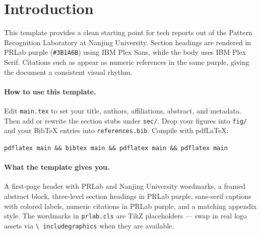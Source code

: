 \section{Introduction}
\label{sec:intro}

This template provides a clean starting point for tech reports out of the
Pattern Recognition Laboratory at Nanjing University. Section headings are
rendered in PRLab purple (\texttt{\#3B1A6B}) using IBM Plex Sans, while
the body uses IBM Plex Serif. Citations such as \citep{vaswani2017attention}
appear as numeric references in the same purple, giving the document a
consistent visual rhythm.

\paragraph{How to use this template.}
Edit \texttt{main.tex} to set your title, authors, affiliations, abstract,
and metadata. Then add or rewrite the section stubs under \texttt{sec/}.
Drop your figures into \texttt{fig/} and your BibTeX entries into
\texttt{references.bib}. Compile with pdfLaTeX:

\begin{center}
\texttt{pdflatex main \&\& bibtex main \&\& pdflatex main \&\& pdflatex main}
\end{center}

\paragraph{What the template gives you.}
A first-page header with PRLab and Nanjing University wordmarks, a framed
abstract block, three-level section headings in PRLab purple, sans-serif
captions with colored labels, numeric citations in PRLab purple, and a
matching appendix style. The wordmarks in \texttt{prlab.cls} are TikZ
placeholders --- swap in real logo assets via \texttt{\textbackslash
includegraphics} when they are available.
